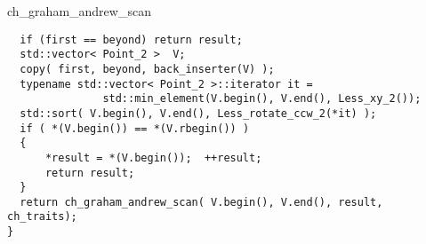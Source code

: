 \begin{ccRefFunction}{ch_graham_andrew_scan}
\begin{verbatim}
  if (first == beyond) return result;
  std::vector< Point_2 >  V;
  copy( first, beyond, back_inserter(V) );
  typename std::vector< Point_2 >::iterator it = 
               std::min_element(V.begin(), V.end(), Less_xy_2());
  std::sort( V.begin(), V.end(), Less_rotate_ccw_2(*it) );
  if ( *(V.begin()) == *(V.rbegin()) )
  {
      *result = *(V.begin());  ++result;
      return result;
  }
  return ch_graham_andrew_scan( V.begin(), V.end(), result, ch_traits);
}
\end{verbatim}


\end{ccRefFunction}


